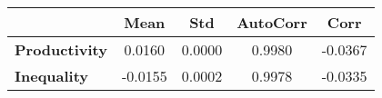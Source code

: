 \begin{tiny}\begin{tabular}{|l|c|c|c|c|}
\hline
&\textbf{Mean}&\textbf{Std}&\textbf{AutoCorr}&\textbf{Corr}\\\hline
\textbf{Productivity}&0.0160&0.0000&0.9980&-0.0367\\\hline
\textbf{Inequality}&-0.0155&0.0002&0.9978&-0.0335\\\hline
\end{tabular}
\end{tiny}